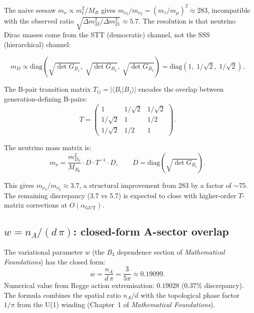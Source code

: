 \documentclass[12pt]{article}
\theoremstyle{remark}
\theoremstyle{definition}
\newcommand{\agut}{\alpha_{\mathrm{GUT}}}
\begin{document}
The naive seesaw $m_\nu \propto m_\ell^2 / M_R$ gives $m_{\nu_3}/m_{\nu_2} = (m_\tau/m_\mu)^2 \approx 283$, incompatible with the observed ratio $\sqrt{\Delta m^2_{32}/\Delta m^2_{21}} \approx 5.7$.  The resolution is that neutrino Dirac masses come from the STT (democratic) channel, not the SSS (hierarchical) channel:

\begin{equation}
m_D \propto \text{diag}(\sqrt{\det G_{B_1}},\; \sqrt{\det G_{B_2}},\; \sqrt{\det G_{B_3}}) = \text{diag}(1,\; 1/\sqrt{2},\; 1/\sqrt{2}).
\end{equation}

The B-pair transition matrix $T_{ij} = |\langle B_i | B_j \rangle|$ encodes the overlap between generation-defining B-pairs:
\begin{equation}
T = \begin{pmatrix} 1 & 1/\sqrt{2} & 1/\sqrt{2} \\ 1/\sqrt{2} & 1 & 1/2 \\ 1/\sqrt{2} & 1/2 & 1 \end{pmatrix}.
\end{equation}

The neutrino mass matrix is:
\begin{equation}
m_\nu = \frac{m_{D_0}^2}{M_{R_0}} \cdot D \cdot T^{-1} \cdot D, \qquad D = \text{diag}(\sqrt{\det G_{B_i}}).
\end{equation}

This gives $m_{\nu_3}/m_{\nu_2} \approx 3.7$, a structural improvement from 283 by a factor of $\sim 75$.  The remaining discrepancy (3.7 vs 5.7) is expected to close with higher-order $T$-matrix corrections at $O(\agut)$.

\subsection{$w = n_A/(d\,\pi)$: closed-form A-sector overlap}
\label{sec:w_closed}

The variational parameter $w$ (the $B_3$ dependence section of \textit{Mathematical Foundations}) has the closed form:
\begin{equation}
\boxed{w = \frac{n_A}{d\,\pi} = \frac{3}{5\pi} \approx 0.19099.}
\end{equation}
Numerical value from Regge action extremisation: $0.19028$ ($0.37\%$ discrepancy).  The formula combines the spatial ratio $n_A/d$ with the topological phase factor $1/\pi$ from the U(1) winding (Chapter~1 of \textit{Mathematical Foundations}).
\end{document}
